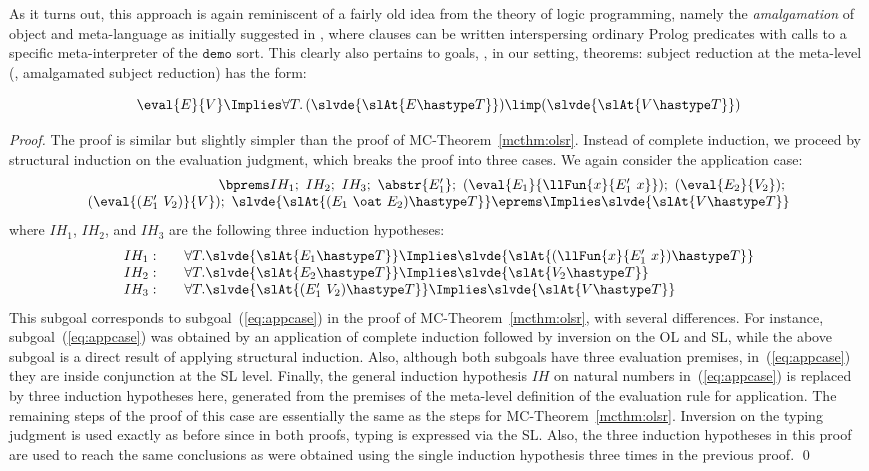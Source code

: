 \documentclass[final]{svjour3}
\begin{document}
As it turns out, this approach is again reminiscent of a fairly old
idea from the theory of logic programming, namely the
\emph{amalgamation} of object and meta-language as initially suggested
in \cite{metalp82}, where clauses can be written interspersing
ordinary Prolog predicates with calls to a specific meta-interpreter of
the $\mathtt{demo}$ sort. This clearly also pertains to goals, \ie, in
our setting, theorems: subject reduction at the meta-level
(\ie, amalgamated subject reduction) has the form:
\begin{goal}
$$\eval{E}{V}\Implies\forall T.\, (\slvde{\slAt{E\hastype T}}) \limp
  (\slvde{\slAt{V\hastype T}})$$
\end{goal}
\begin{proof}
The proof is similar but slightly simpler than the proof of
MC-Theorem~\ref{mcthm:olsr}.  Instead of complete induction,
we proceed by structural induction on the evaluation judgment, which
breaks the proof into three cases.  We again consider the
application case:
$$\begin{array}{rcl}
\bprems IH_1;\,\,IH_2;\,\,IH_3;\,\,\abstr{E'_1};\,\,
  (\eval{E_1}{\llFun{x}{E'_1\ x}});\,\,
  (\eval{E_2}{V_2});\,\,\\
  (\eval{(E'_1\ V_2)}{V});\,\,
\slvde{\slAt{(E_1\ \oat\ E_2)\hastype T}} \eprems
 \Implies \slvde{\slAt{V \hastype T}} 
\end{array}$$
where $IH_1$, $IH_2$, and $IH_3$ are the following three induction
hypotheses:
$$\begin{array}{ll}
IH_1:\quad & \forall T. \slvde{\slAt{E_1\hastype T}}
\Implies \slvde{\slAt{(\llFun{x}{E_1'\ x})\hastype T}} \\
IH_2:\quad & \forall T. \slvde{\slAt{E_2\hastype T}}
\Implies \slvde{\slAt{V_2\hastype T}} \\
IH_3:\quad & \forall T. \slvde{\slAt{(E'_1\ V_2)\hastype T}}
\Implies \slvde{\slAt{V\hastype T}}
\end{array}$$
This subgoal corresponds to subgoal~(\ref{eq:appcase}) in the proof of
MC-Theorem~\ref{mcthm:olsr}, with several differences.  For
instance, subgoal~(\ref{eq:appcase}) was obtained by an application of
complete induction followed by inversion on the OL and SL, while the
above subgoal is a direct result of applying structural induction.
Also, although both subgoals have three evaluation premises,
in~(\ref{eq:appcase}) they are inside conjunction at the SL level.
Finally, the general induction hypothesis $IH$ on natural numbers
in~(\ref{eq:appcase}) is replaced by three induction hypotheses here,
generated from the premises of the meta-level definition of the
evaluation rule for application.  The remaining steps of the proof
of this case are essentially the same as the steps for
MC-Theorem~\ref{mcthm:olsr}.  Inversion on the typing
judgment is used exactly as before since in both proofs, typing is
expressed via the SL\@.  Also, the three induction hypotheses in this
proof are used to reach the same conclusions as were obtained using
the single induction hypothesis three times in the previous proof.
\qed\end{proof}
\end{document}
